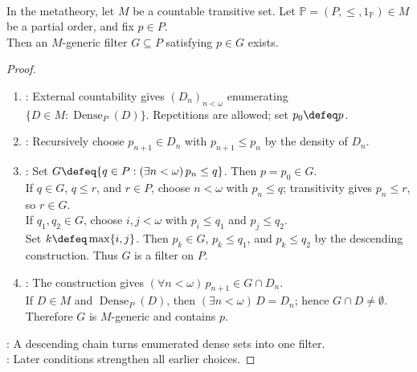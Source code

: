 \begin{theorem} \label{thm:generic-filter-existence} \\
In the metatheory, let $M$ be a countable transitive set. Let $\mathbb{P}=(P,\leq,1_{\mathbb{P}})\in M$ be a partial order, and fix $p\in P$.\\
Then an $M$-generic filter $G\subseteq P$ satisfying $p\in G$ exists.
\begin{proof}
\begin{enumerate}[label=(\roman*)]
\setlength{\itemsep}{0pt}
\item {}: External countability gives $(D_n)_{n<\omega}$ enumerating $\{D\in M:\operatorname{Dense}_P(D)\}$. Repetitions are allowed; set $p_0\defeq p$.
\item {}: Recursively choose $p_{n+1}\in D_n$ with $p_{n+1}\leq p_n$ by the density of $D_n$.
\item {}: Set $G\defeq\{q\in P:(\exists n<\omega)\,p_n\leq q\}$. Then $p=p_0\in G$.\\
If $q\in G$, $q\leq r$, and $r\in P$, choose $n<\omega$ with $p_n\leq q$; transitivity gives $p_n\leq r$, so $r\in G$.\\
If $q_1,q_2\in G$, choose $i,j<\omega$ with $p_i\leq q_1$ and $p_j\leq q_2$.\\
Set $k\defeq\max\{i,j\}$. Then $p_k\in G$, $p_k\leq q_1$, and $p_k\leq q_2$ by the descending construction. Thus $G$ is a filter on $P$.
\item {}: The construction gives $(\forall n<\omega)\,p_{n+1}\in G\cap D_n$.\\
If $D\in M$ and $\operatorname{Dense}_P(D)$, then $(\exists n<\omega)\,D=D_n$; hence $G\cap D\neq\emptyset$. Therefore $G$ is $M$-generic and contains $p$.
\end{enumerate}
: A descending chain turns enumerated dense sets into one filter.\\
: Later conditions strengthen all earlier choices.
\end{proof}
\end{theorem}

